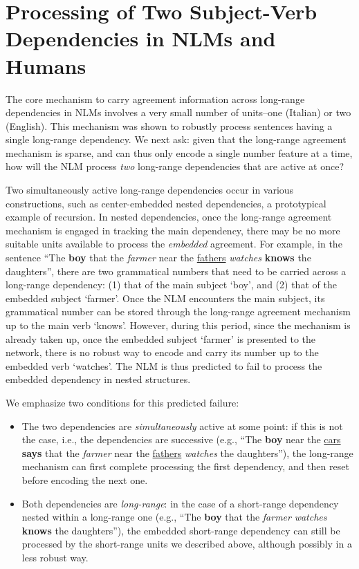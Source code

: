 \section{Processing of Two Subject-Verb Dependencies in NLMs and Humans}
The core mechanism to carry agreement information across long-range dependencies in NLMs involves a very small number of units--one (Italian) or two (English). This mechanism was shown to robustly process sentences having a single long-range dependency. We next ask: given that the long-range agreement mechanism is sparse, and can thus only encode a single number feature at a time, how will the NLM process \emph{two} long-range dependencies that are active at once?

Two simultaneously active long-range dependencies occur in various constructions, such as center-embedded nested dependencies, a prototypical example of recursion. In nested dependencies, once the long-range agreement mechanism is engaged in tracking the main dependency, there may be no more suitable units available to process the \textit{embedded} agreement. For example, in the sentence ``The \textbf{boy} that the \textit{farmer} near the \underline{fathers} \textit{watches} \textbf{knows} the daughters'', there are two grammatical numbers that need to be carried across a long-range dependency: (1) that of the main subject `boy', and (2) that of the embedded subject `farmer'. Once the NLM  encounters the main subject, its grammatical number can be stored through the long-range agreement mechanism up to the main verb `knows'. However, during this period, since the mechanism is already taken up, once the embedded subject `farmer' is presented to the network, there is no robust way to encode and carry its number up to the embedded verb `watches'. The NLM is thus predicted to fail to process the embedded dependency in nested structures.

We emphasize two conditions for this predicted failure:
\begin{itemize}
	\item The two dependencies are \textit{simultaneously} active at some point: if this is not the case, i.e., the dependencies are successive (e.g., ``The \textbf{boy} near the \underline{cars} \textbf{says} that the \textit{farmer} near the \underline{fathers} \textit{watches} the daughters''), the long-range mechanism can first complete processing the first dependency, and then reset before encoding the next one. 

        \item Both dependencies are \textit{long-range}: in the case
          of a short-range dependency nested within a long-range one
          (e.g., ``The \textbf{boy} that the \textit{farmer}
          \textit{watches} \textbf{knows} the daughters''), the
          embedded short-range dependency can still be processed by
          the short-range units we described above, although possibly
          in a less robust way.
\end{itemize}


